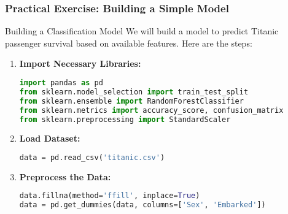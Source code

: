 \documentclass[aspectratio=169]{beamer}
\begin{document}
\begin{frame}[fragile]
    \frametitle{Practical Exercise: Building a Simple Model}
    \begin{block}{Building a Classification Model}
        We will build a model to predict Titanic passenger survival based on available features. Here are the steps:
    \end{block}
    \begin{enumerate}
        \item \textbf{Import Necessary Libraries:}
        \begin{lstlisting}[language=Python]
import pandas as pd
from sklearn.model_selection import train_test_split
from sklearn.ensemble import RandomForestClassifier
from sklearn.metrics import accuracy_score, confusion_matrix
from sklearn.preprocessing import StandardScaler
        \end{lstlisting}
        
        \item \textbf{Load Dataset:}
        \begin{lstlisting}[language=Python]
data = pd.read_csv('titanic.csv')
        \end{lstlisting}
        
        \item \textbf{Preprocess the Data:}
        \begin{lstlisting}[language=Python]
data.fillna(method='ffill', inplace=True)
data = pd.get_dummies(data, columns=['Sex', 'Embarked'])
        \end{lstlisting}
    \end{enumerate}
\end{frame}
\end{document}
